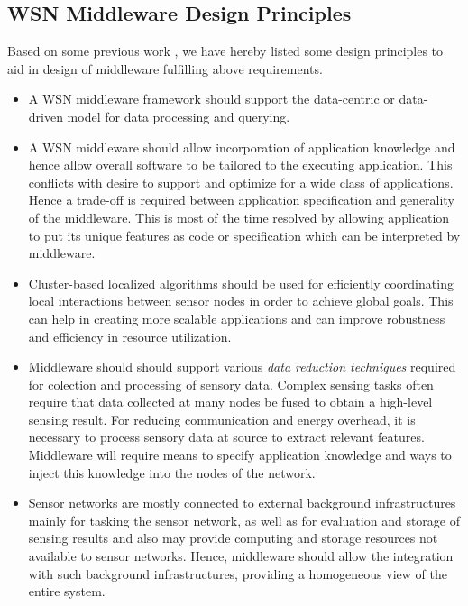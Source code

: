 \subsection{WSN Middleware Design Principles}
Based on some previous work \cite{Estrin99,Yu04},
we have hereby listed some design principles to
aid in design of middleware fulfilling above
requirements.
\begin{itemize}
  \item A WSN middleware framework should support
  the data-centric or data-driven model for data
  processing and querying.
  \item A WSN middleware should allow
  incorporation of application knowledge and
  hence allow overall software to be tailored to
  the executing application. This conflicts with
  desire to support and optimize for a wide class
  of applications. Hence a trade-off is required
  between application specification and
  generality of the middleware. This is most of
  the time resolved by allowing application to
  put its unique features as code or
  specification which can be interpreted by
  middleware.
  \item Cluster-based localized algorithms should
  be used for efficiently coordinating local
  interactions between sensor nodes in order to
  achieve global goals. This can help in creating
  more scalable applications and can improve
  robustness and efficiency in resource
  utilization.
  \item Middleware should should support various
  \emph{data reduction techniques} required for
  colection and processing of sensory data.
  Complex sensing tasks often require that data
  collected at many nodes be fused to obtain a
  high-level sensing result. For reducing
  communication and energy overhead, it is
  necessary to process sensory data at source to
  extract relevant features. Middleware will
  require means to specify application knowledge
  and ways to inject this knowledge into the
  nodes of the network.
  \item Sensor networks are mostly connected to
  external background infrastructures mainly for
  tasking the sensor network, as well as for
  evaluation and storage of sensing results and
  also may provide computing and storage
  resources not available to sensor networks.
  Hence, middleware should allow the integration
  with such background infrastructures, providing
  a homogeneous view of the entire system.
\end{itemize}

